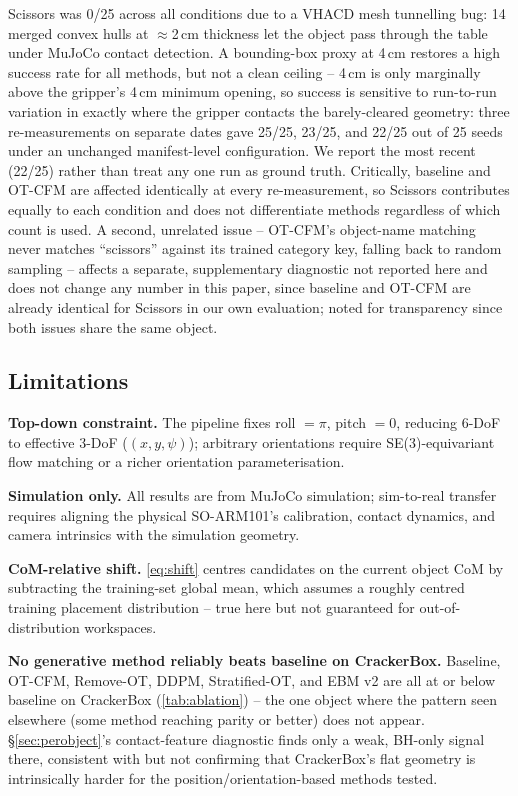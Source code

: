 \documentclass[journal]{IEEEtran}
\begin{document}
Scissors was 0/25 across all conditions due to a VHACD mesh tunnelling bug:
14 merged convex hulls at $\approx$2\,cm thickness let the object pass
through the table under MuJoCo contact detection. A bounding-box proxy at
4\,cm restores a high success rate for all methods, but not a clean
ceiling -- 4\,cm is only marginally above the gripper's 4\,cm minimum
opening, so success is sensitive to run-to-run variation in exactly where
the gripper contacts the barely-cleared geometry: three re-measurements on
separate dates gave 25/25, 23/25, and 22/25 out of 25 seeds under an
unchanged manifest-level configuration. We report the most recent (22/25)
rather than treat any one run as ground truth. Critically, baseline and
OT-CFM are affected identically at every re-measurement, so Scissors
contributes equally to each condition and does not differentiate methods
regardless of which count is used. A second, unrelated issue -- OT-CFM's
object-name matching never matches ``scissors'' against its trained
category key, falling back to random sampling -- affects a separate,
supplementary diagnostic not reported here and does not change any number
in this paper, since baseline and OT-CFM are already identical for
Scissors in our own evaluation; noted for transparency since both issues
share the same object.

\subsection{Limitations}

\noindent\textbf{Top-down constraint.} The pipeline fixes roll $=\pi$,
pitch $=0$, reducing 6-DoF to effective 3-DoF ($(x,y,\psi)$); arbitrary
orientations require SE(3)-equivariant flow matching or a richer
orientation parameterisation.

\noindent\textbf{Simulation only.} All results are from MuJoCo simulation;
sim-to-real transfer requires aligning the physical SO-ARM101's
calibration, contact dynamics, and camera intrinsics with the simulation
geometry.

\noindent\textbf{CoM-relative shift.} \cref{eq:shift} centres candidates on
the current object CoM by subtracting the training-set global mean, which
assumes a roughly centred training placement distribution -- true here but
not guaranteed for out-of-distribution workspaces.

\noindent\textbf{No generative method reliably beats baseline on
CrackerBox.} Baseline, OT-CFM, Remove-OT, DDPM, Stratified-OT, and EBM v2
are all at or below baseline on CrackerBox (\cref{tab:ablation}) -- the one
object where the pattern seen elsewhere (some method reaching parity or
better) does not appear. \S\ref{sec:perobject}'s contact-feature
diagnostic finds only a weak, BH-only signal there, consistent with but not
confirming that CrackerBox's flat geometry is intrinsically harder for the
position/orientation-based methods tested.
\end{document}
